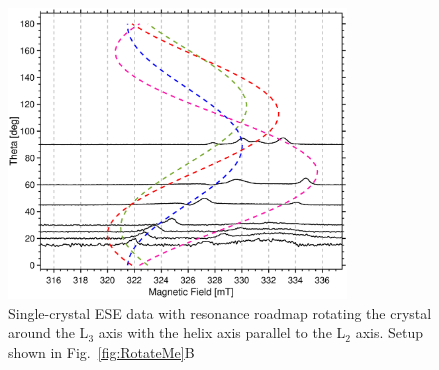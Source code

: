\begin{figure}[ht]
\centering
 \includegraphics[width=0.8\textwidth]{Kapitel/Appendix/RotateCrystal.eps}
 \caption[Single Crystal Roadmap around L$_3$ axis rotated B$_1$ to the L$_2$ axis.]{Single-crystal ESE data with resonance roadmap rotating the crystal around the L$_3$ axis with the helix axis parallel to the L$_2$ axis. Setup shown in Fig.~\ref{fig:RotateMe}B} 
\end{figure} \label{fig-app:Rotate90}

